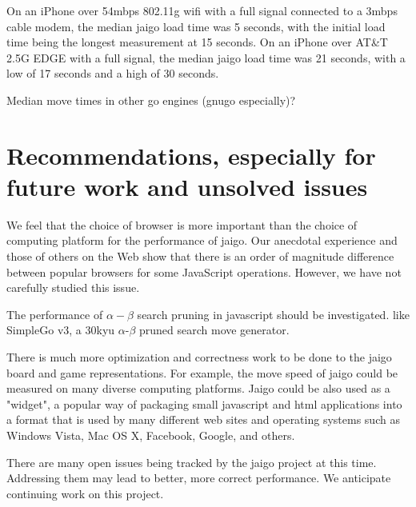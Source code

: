 \documentclass{memoir}
\begin{document}
On an iPhone over 54mbps 802.11g wifi with a full signal connected to a 3mbps cable modem, the median jaigo load time was 5 seconds, with the initial load time being the longest measurement at 15 seconds. On an iPhone over AT\&T 2.5G EDGE with a full signal, the median jaigo load time was 21 seconds, with a low of 17 seconds and a high of 30 seconds.

Median move times in other go engines (gnugo especially)?

\chapter{Recommendations, especially for future work and unsolved issues}
We feel that the choice of browser is more important than the choice of computing platform for the performance of jaigo. Our anecdotal experience and those of others on the Web show that there is an order of magnitude difference between popular browsers for some JavaScript operations. However, we have not carefully studied this issue.%

The performance of $\alpha-\beta$ search pruning in javascript should be investigated. like SimpleGo v3, a 30kyu $\alpha$-$\beta$ pruned search move generator.

There is much more optimization and correctness work to be done to the jaigo board and game representations. For example, the move speed of jaigo could be measured on many diverse computing platforms. Jaigo could be also used as a "widget", a popular way of packaging small javascript and html applications into a format that is used by many different web sites and operating systems such as Windows Vista, Mac OS X, Facebook, Google, and others.

There are many open issues being tracked by the jaigo project at this time. Addressing them may lead to better, more correct performance. We anticipate continuing work on this project.

\backmatter


\end{document}
